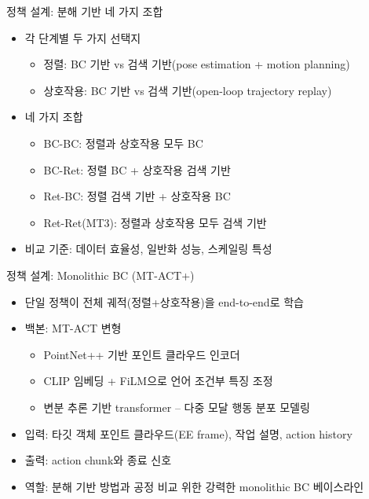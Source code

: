 \documentclass[aspectratio=169]{beamer}
\begin{document}
\begin{frame}{정책 설계: 분해 기반 네 가지 조합}
  \small
  \begin{itemize}
    \item 각 단계별 두 가지 선택지
    \begin{itemize}
      \item 정렬: BC 기반 vs 검색 기반(pose estimation + motion planning)
      \item 상호작용: BC 기반 vs 검색 기반(open-loop trajectory replay)
    \end{itemize}
    \item 네 가지 조합
    \begin{itemize}
      \item BC-BC: 정렬과 상호작용 모두 BC
      \item BC-Ret: 정렬 BC + 상호작용 검색 기반
      \item Ret-BC: 정렬 검색 기반 + 상호작용 BC
      \item Ret-Ret(MT3): 정렬과 상호작용 모두 검색 기반
    \end{itemize}
    \item 비교 기준: 데이터 효율성, 일반화 성능, 스케일링 특성
  \end{itemize}
\end{frame}

\begin{frame}{정책 설계: Monolithic BC (MT-ACT+)}
  \small
  \begin{itemize}
    \item 단일 정책이 전체 궤적(정렬+상호작용)을 end-to-end로 학습
    \item 백본: MT-ACT 변형
    \begin{itemize}
      \item PointNet++ 기반 포인트 클라우드 인코더
      \item CLIP 임베딩 + FiLM으로 언어 조건부 특징 조정
      \item 변분 추론 기반 transformer – 다중 모달 행동 분포 모델링
    \end{itemize}
    \item 입력: 타깃 객체 포인트 클라우드(EE frame), 작업 설명, action history
    \item 출력: action chunk와 종료 신호
    \item 역할: 분해 기반 방법과 공정 비교 위한 강력한 monolithic BC 베이스라인
  \end{itemize}
\end{frame}
\end{document}
